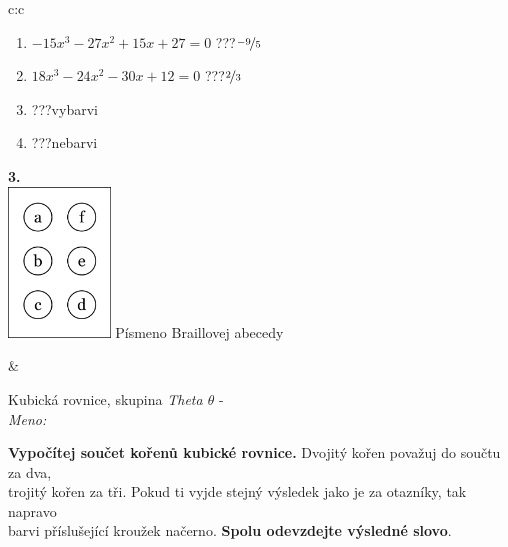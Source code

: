 \documentclass[10pt]{report}
\begin{document}
\begin{tabular}{c:c}
\begin{minipage}[c][104.5mm][t]{0.5\linewidth}
\begin{center}
\begin{minipage}{0.79\linewidth}
\begin{center}
\begin{varwidth}{\linewidth}
\begin{enumerate}
\item $-15x^3-27x^2+15x+27=0$\quad \dotfill\; ???\;\dotfill \quad $\nicefrac{-9}{5}$
\item $18x^3-24x^2-30x+12=0$\quad \dotfill\; ???\;\dotfill \quad $\nicefrac{2}{3}$
\item \quad \dotfill\; ???\;\dotfill \quad vybarvi
\item \quad \dotfill\; ???\;\dotfill \quad nebarvi
\end{enumerate}
\end{varwidth}
\end{center}
\end{minipage}
\begin{minipage}{0.20\linewidth}
\begin{center}
{\Huge\bfseries 3.} \\[2mm]
\includegraphics[height=40mm]{../images/braille.png}
{\small Písmeno Braillovej abecedy}
\end{center}
\end{minipage}
\end{center}
\end{minipage}
&
\begin{minipage}[c][104.5mm][t]{0.5\linewidth}
\begin{center}
\vspace{7mm}
{\huge Kubická rovnice, skupina \textit{Theta $\theta$} -}\\[5mm]
\textit{Meno:}\phantom{xxxxxxxxxxxxxxxxxxxxxxxxxxxxxxxxxxxxxxxxxxxxxxxxxxxxxxxxxxxxxxxxx}\\[5mm]
\begin{minipage}{0.95\linewidth}
\textbf{Vypočítej součet kořenů kubické rovnice.} Dvojitý kořen považuj do součtu za dva,\\trojitý kořen za tři. Pokud ti vyjde stejný výsledek jako je za otazníky, tak napravo\\barvi příslušející kroužek načerno. \textbf{Spolu odevzdejte výsledné slovo}.
\end{minipage}
\\[1mm]
\begin{minipage}{0.79\linewidth}

\end{minipage}
\end{center}
\end{minipage}
\end{tabular}
\end{document}
